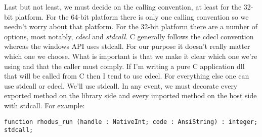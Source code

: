 Last but not least, we must decide on the calling convention, at least for the 32-bit platform. For the 64-bit platform there is only one calling convention so we needn't worry about that platform. For the 32-bit platform there are a number of options, most notably, {\em cdecl} and {\em stdcall}. C generally follows the cdecl convention whereas the windows API uses stdcall. For our purpose it doesn't really matter which one we choose. What is important is that we make it clear which one we're using and that the caller must comply. If I'm writing a pure C application dll that will be called from C then I tend to use cdecl. For everything else one can use stdcall or cdecl. We'll use stdcall. In any event, we must decorate every exported method on the library side and every imported method on the host side with stdcall. For example:

\begin{lstlisting}
function rhodus_run (handle : NativeInt; code : AnsiString) : integer; stdcall;
\end{lstlisting}

